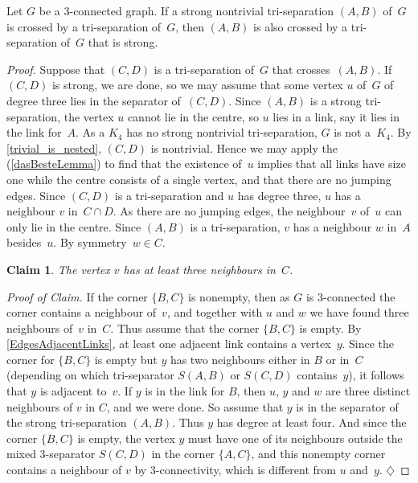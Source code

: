 \documentclass{aic}
\newenvironment{cproof}{\noindent\textit{Proof of Claim.}}{\phantom{!}\!\hfill$\diamondsuit$}
\theoremstyle{plain}
\newtheorem{sublem}{Claim}[thm]
\theoremstyle{definition}
\theoremstyle{plain}
\theoremstyle{plain}
\begin{document}
\begin{lem}\label{orangeLemma}
Let $G$ be a 3-connected graph.
If a strong nontrivial tri-separation $(A,B)$ of~$G$ is crossed by a tri-separation of~$G$, then $(A,B)$ is also crossed by a tri-separation of~$G$ that is strong.
\end{lem}
\begin{proof}
Suppose that $(C,D)$ is a tri-separation of~$G$ that crosses~$(A,B)$.
If $(C,D)$ is strong, we are done, so we may assume that some vertex $u$ of~$G$ of degree three lies in the separator of~$(C,D)$.
Since $(A,B)$ is a strong tri-separation, the vertex $u$ cannot lie in the centre, so $u$ lies in a link, say it lies in the link for~$A$.
As a $K_4$ has no strong nontrivial tri-separation, $G$ is not a~$K_4$.
By \autoref{trivial_is_nested}, $(C,D)$ is nontrivial.
Hence we may apply the  (\ref{dasBesteLemma}) to find that the existence of~$u$ implies that all links have size one while the centre consists of a single vertex, and that there are no jumping edges.
Since $(C,D)$ is a tri-separation and $u$ has degree three, $u$ has a neighbour $v$ in~$C\cap D$.
As there are no jumping edges, the neighbour~$v$ of~$u$ can only lie in the centre.
Since $(A,B)$ is a tri-separation, $v$ has a neighbour $w$ in~$A$ besides~$u$.
By symmetry~$w\in C$.

\begin{sublem}\label{wHasThreeNeighboursInC}
The vertex $v$ has at least three neighbours in~$C$.
\end{sublem}


\begin{cproof}
If the corner $\{B,C\}$ is nonempty, then as $G$ is 3-connected the corner contains a neighbour of~$v$, and together with $u$ and $w$ we have found three neighbours of~$v$ in~$C$. Thus assume that the corner  $\{B,C\}$ is empty. 
By \autoref{EdgesAdjacentLinks}, at least one adjacent link contains a vertex~$y$.
Since the corner for $\{B,C\}$ is empty but $y$ has two neighbours either in $B$ or in~$C$ (depending on which tri-separator $S(A,B)$ or $S(C,D)$ contains~$y$), it follows that $y$ is adjacent to~$v$.
If $y$ is in the link for $B$, then $u$, $y$ and $w$ are three distinct neighbours of $v$ in $C$, and we were done.
So assume that $y$ is in the separator of the strong tri-separation $(A,B)$. Thus $y$ has degree at least four. And since the corner $\{B,C\}$ is empty, the vertex $y$ must have one of its neighbours outside the mixed 3-separator $S(C,D)$ in the corner $\{A,C\}$, and this nonempty corner contains a neighbour of $v$ by 3-connectivity, which is different from $u$ and~$y$. 
\end{cproof}
\medskip


\end{proof}
\end{document}
